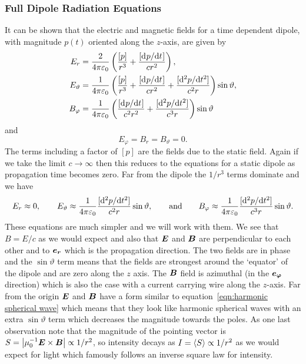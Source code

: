     \subsubsection{Full Dipole Radiation Equations}
    It can be shown that the electric and magnetic fields for a time dependent dipole, with magnitude \(p(t)\) oriented along the \(z\)-axis, are given by
    \begin{align*}
        E_r &= \frac{2}{4\pi\varepsilon_0} \left(\frac{[p]}{r^3} + \frac{[\inlinedv{p}{t}]}{cr^2}\right),\\
        E_\vartheta &= \frac{1}{4\pi\varepsilon_0} \left(\frac{[p]}{r^3} + \frac{[\inlinedv{p}{t}]}{cr^2} + \frac{[\inlinedv[2]{p}{t}]}{c^2r} \right) \sin\vartheta,\\
        B_\varphi &= \frac{1}{4\pi\varepsilon_0} \left(\frac{[\inlinedv{p}{t}]}{c^2r^2} + \frac{[\inlinedv[2]{p}{t}]}{c^3r}\right) \sin\vartheta
    \end{align*}
    and
    \[E_\varphi = B_r = B_\vartheta = 0.\]
    The terms including a factor of \([p]\) are the fields due to the static field.
    Again if we take the limit \(c\to\infty\) then this reduces to the equations for a static dipole as propagation time becomes zero.
    Far from the dipole the \(1/r^3\) terms dominate and we have
    \[E_r\approx 0, \qquad E_{\vartheta} \approx \frac{1}{4\pi\varepsilon_0} \frac{[\inlinedv[2]{p}{t}]}{c^2r}\sin\vartheta, \qquad\text{and}\qquad B_\varphi \approx \frac{1}{4\pi\varepsilon_0} \frac{[\inlinedv[2]{p}{t}]}{c^3r}\sin\vartheta.\]
    These equations are much simpler and we will work with them.
    We see that \(B = E/c\) as we would expect and also that \(\vv{E}\) and \(\vv{B}\) are perpendicular to each other and to \(\ve{r}\) which is the propagation direction.
    The two fields are in phase and the \(\sin\vartheta\) term means that the fields are strongest around the `equator' of the dipole and are zero along the \(z\) axis.
    The \(\vv{B}\) field is azimuthal (in the \(\ve{\varphi}\) direction) which is also the case with a current carrying wire along the \(z\)-axis.
    Far from the origin \(\vv{E}\) and \(\vv{B}\) have a form similar to  equation~\ref{eqn:harmonic spherical wave} which means that they look like harmonic spherical waves with an extra \(\sin\vartheta\) term which decreases the magnitude towards the poles.
    As one last observation note that the magnitude of the pointing vector is \(S = \abs{\mu_0^{-1}\vv{E}\times\vv{B}} \propto 1/r^2\), so intensity decays as \(I = \expected{S} \propto 1/r^2\) as we would expect for light which famously follows an inverse square law for intensity.
    
